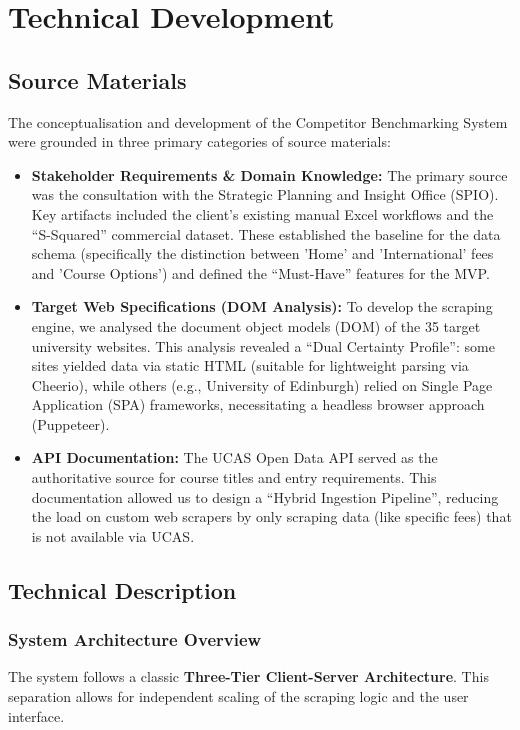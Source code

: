 \section{Technical Development}

\subsection{Source Materials}
The conceptualisation and development of the Competitor Benchmarking System were grounded in three primary categories of source materials:

\begin{itemize}
    \item \textbf{Stakeholder Requirements \& Domain Knowledge:} The primary source was the consultation with the Strategic Planning and Insight Office (SPIO). Key artifacts included the client's existing manual Excel workflows and the ``S-Squared'' commercial dataset. These established the baseline for the data schema (specifically the distinction between 'Home' and 'International' fees and 'Course Options') and defined the ``Must-Have'' features for the MVP.
    \item \textbf{Target Web Specifications (DOM Analysis):} To develop the scraping engine, we analysed the document object models (DOM) of the 35 target university websites. This analysis revealed a ``Dual Certainty Profile'': some sites yielded data via static HTML (suitable for lightweight parsing via Cheerio), while others (e.g., University of Edinburgh) relied on Single Page Application (SPA) frameworks, necessitating a headless browser approach (Puppeteer).
    \item \textbf{API Documentation:} The UCAS Open Data API served as the authoritative source for course titles and entry requirements. This documentation allowed us to design a ``Hybrid Ingestion Pipeline'', reducing the load on custom web scrapers by only scraping data (like specific fees) that is not available via UCAS.
\end{itemize}

\subsection{Technical Description}

\subsubsection{System Architecture Overview}
The system follows a classic \textbf{Three-Tier Client-Server Architecture}. This separation allows for independent scaling of the scraping logic and the user interface.

